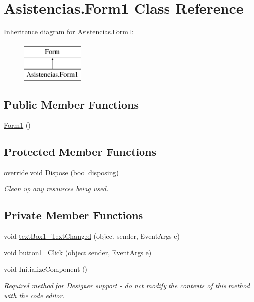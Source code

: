 \hypertarget{class_asistencias_1_1_form1}{\section{Asistencias.\-Form1 Class Reference}
\label{class_asistencias_1_1_form1}
}
Inheritance diagram for Asistencias.\-Form1\-:\begin{figure}[H]
\begin{center}
\leavevmode
\includegraphics[height=2.000000cm]{d4/d09/class_asistencias_1_1_form1}
\end{center}
\end{figure}
\subsection*{Public Member Functions}
\begin{DoxyCompactItemize}
\item 
\hyperlink{class_asistencias_1_1_form1_a395d9c6aed727e23e05060f436961e07}{Form1} ()
\end{DoxyCompactItemize}
\subsection*{Protected Member Functions}
\begin{DoxyCompactItemize}
\item 
override void \hyperlink{class_asistencias_1_1_form1_a9971aacdba72bfabb56ad897f7647234}{Dispose} (bool disposing)
\begin{DoxyCompactList}\small\item\em Clean up any resources being used. \end{DoxyCompactList}\end{DoxyCompactItemize}
\subsection*{Private Member Functions}
\begin{DoxyCompactItemize}
\item 
void \hyperlink{class_asistencias_1_1_form1_af10b95ddc92aac894e00c5b5889a0296}{text\-Box1\-\_\-\-Text\-Changed} (object sender, Event\-Args e)
\item 
void \hyperlink{class_asistencias_1_1_form1_a07d3c806a872b060ee9262a361029085}{button1\-\_\-\-Click} (object sender, Event\-Args e)
\item 
void \hyperlink{class_asistencias_1_1_form1_a0789ba8c94bdbf7bebe8d5ac7021bffb}{Initialize\-Component} ()
\begin{DoxyCompactList}\small\item\em Required method for Designer support -\/ do not modify the contents of this method with the code editor. \end{DoxyCompactList}\end{DoxyCompactItemize}
